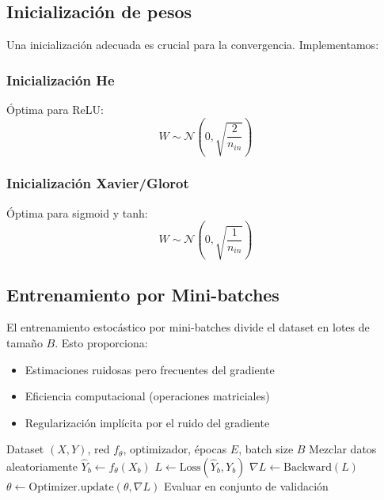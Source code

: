 \documentclass[a4paper,11pt]{article}
\begin{document}
\subsection{Inicialización de pesos}

Una inicialización adecuada es crucial para la convergencia. Implementamos:

\subsubsection{Inicialización He}
Óptima para ReLU:
\begin{equation}
W \sim \mathcal{N}\left(0, \sqrt{\frac{2}{n_{in}}}\right)
\end{equation}

\subsubsection{Inicialización Xavier/Glorot}
Óptima para sigmoid y tanh:
\begin{equation}
W \sim \mathcal{N}\left(0, \sqrt{\frac{1}{n_{in}}}\right)
\end{equation}

\subsection{Entrenamiento por Mini-batches}

El entrenamiento estocástico por mini-batches divide el dataset en lotes de tamaño $B$. Esto proporciona:
\begin{itemize}
    \item Estimaciones ruidosas pero frecuentes del gradiente
    \item Eficiencia computacional (operaciones matriciales)
    \item Regularización implícita por el ruido del gradiente
\end{itemize}

\begin{algorithm}[H]
\caption{Bucle de Entrenamiento con Mini-batches}
\begin{algorithmic}[1]
\Require Dataset $(X, Y)$, red $f_\theta$, optimizador, épocas $E$, batch size $B$
    \State Mezclar datos aleatoriamente
        \State $\hat{Y}_b \gets f_\theta(X_b)$ 
        \State $L \gets \text{Loss}(\hat{Y}_b, Y_b)$ 
        \State $\nabla L \gets \text{Backward}(L)$ 
        \State $\theta \gets \text{Optimizer.update}(\theta, \nabla L)$ 
    \EndFor
    \State Evaluar en conjunto de validación
\EndFor
\end{algorithmic}
\end{algorithm}
\end{document}
